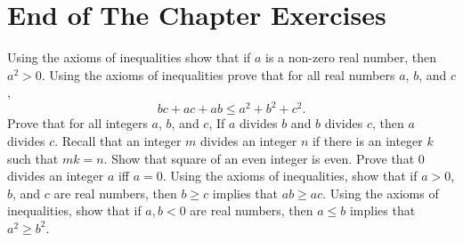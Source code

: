 \section*{End of The Chapter Exercises}
\begin{exercises}
  \exerciseitem Using the axioms of inequalities show that if $a$ is a non-zero
    real number, then $a^2 > 0$.
  \exerciseitem Using the axioms of inequalities prove that for all real
    numbers $a$, $b$, and $c$, $$bc + ac + ab \le a^2 + b^2 + c^2.$$
  \exerciseitem Prove that for all integers $a$, $b$, and $c$,
    If $a$ divides $b$ and $b$ divides $c$, then $a$ divides $c$.
    Recall that an integer $m$ divides an integer $n$ if there is an integer
    $k$ such that $mk = n$.
  \exerciseitem Show that square of an even integer is even.
  \exerciseitem Prove that $0$ divides an integer $a$ iff $a = 0$.
  \exerciseitem Using the axioms of inequalities, show that if $a > 0$, $b$, and $c$
    are real numbers, then $b \ge c$ implies that $ab \ge ac$.
  \exerciseitem Using the axioms of inequalities, show that if $a, b < 0$ are real
    numbers, then $a \le b$ implies that $a^2 \ge b^2$.
\end{exercises}
